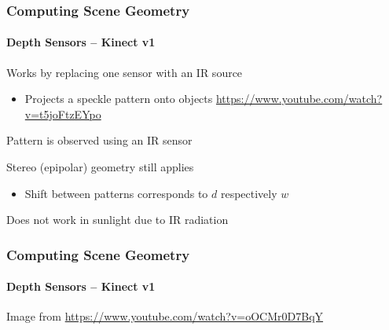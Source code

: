 \documentclass[xetex,professionalfont]{beamer}
\begin{document}
\begin{frame}
\frametitle{Computing Scene Geometry}
\framesubtitle{Depth Sensors -- Kinect v1}

Works by replacing one sensor with an IR source
\begin{itemize}
    \item Projects a speckle pattern onto objects \url{https://www.youtube.com/watch?v=t5joFtzEYpo}
\end{itemize}

\bigskip
Pattern is observed using an IR sensor 

\bigskip
Stereo (epipolar) geometry still applies %
\begin{itemize}
    \item Shift between patterns corresponds to $d$ respectively $w$ %
\end{itemize}

\bigskip
Does not work in sunlight due to IR radiation %

\end{frame}


\begin{frame}
\frametitle{Computing Scene Geometry}
\framesubtitle{Depth Sensors -- Kinect v1}

\begin{center}
    {\centering Image from \url{https://www.youtube.com/watch?v=oOCMr0D7BqY}}
\end{center}

\end{frame}

\end{document}
